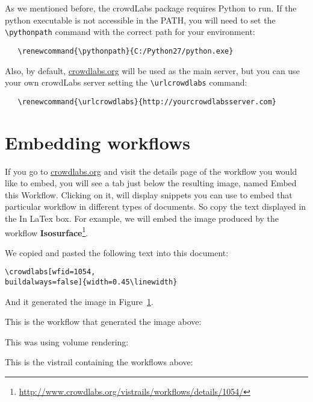 \documentclass{article}
\begin{document}
As we mentioned before, the crowdLabs package requires Python to
run. If the python executable is not accessible in the PATH, you will
need to set the \texttt{\textbackslash pythonpath} command with the correct path for your environment:
 
\begin{verbatim}
   \renewcommand{\pythonpath}{C:/Python27/python.exe}
\end{verbatim}

Also, by default, \url{crowdlabs.org} will be used as the main server, but
you can use your own crowdLabs server setting the \texttt{\textbackslash urlcrowdlabs} command: 
\begin{verbatim}
   \renewcommand{\urlcrowdlabs}{http://yourcrowdlabsserver.com}
\end{verbatim}

\section{Embedding workflows}
If you go to \url{crowdlabs.org} and visit the details page of the
workflow you would like to embed, you will see a tab just below the
resulting image, named \textsf{Embed this Workflow}. Clicking on it,
will display snippets you can use to embed that particular workflow in
different types of documents. So copy the text displayed in the
\textsf{In LaTex} box. For example, we will embed the image produced
by the workflow
\textbf{Isosurface}\footnote{\url{http://www.crowdlabs.org/vistrails/workflows/details/1054/}}.

We copied and pasted the following text into this document:
\begin{verbatim}
\crowdlabs[wfid=1054,
buildalways=false]{width=0.45\linewidth}
\end{verbatim}

And it generated the image in Figure~\ref{fig:isosurface}.
\begin{figure}
\begin{center}
\end{center}
\label{fig:isosurface}
\end{figure}

This is the workflow that generated the image above:\\

\vspace{1.0cm}
This was using volume rendering:\\

This is the vistrail containing the workflows above:\\

\end{document}
